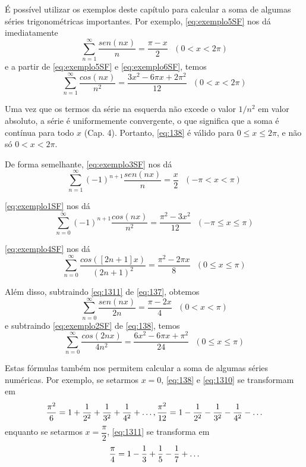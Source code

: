 É possível utilizar os exemplos deste capítulo para calcular a soma de algumas séries trigonométricas 
importantes. Por exemplo, \ref{eq:exemplo5SF} nos dá imediatamente
\begin{equation}
\label{eq:137}
    \sum\limits_{n=1}^{\infty}\dfrac{sen(nx)}{n} = \dfrac{\pi - x}{2}\text{ }(0 < x < 2\pi)
\end{equation}
e a partir de \ref{eq:exemplo5SF} e \ref{eq:exemplo6SF}, temos
\begin{equation}
\label{eq:138}
    \sum\limits_{n=1}^{\infty}\dfrac{cos(nx)}{n^2} = \dfrac{3x^2 - 6\pi x + 2\pi^2}{12}\text{ }(0 < x < 2\pi)
\end{equation}

Uma vez que os termos da série na esquerda não excede o valor $1/n^2$ em valor absoluto, a série é
uniformemente convergente, o que significa que a soma é contínua para todo $x$ (Cap. 4). Portanto,
\ref{eq:138} é válido para $0 \leq x \leq 2\pi$, e não só $0 < x < 2\pi$.

De forma semelhante, \ref{eq:exemplo3SF} nos dá
\begin{equation}
    \label{eq:139}
    \sum\limits_{n=1}^{\infty}(-1)^{n+1}\dfrac{sen(nx)}{n} = \dfrac{x}{2}\text{ }(-\pi < x < \pi)
\end{equation}

\ref{eq:exemplo1SF} nos dá
\begin{equation}
    \label{eq:1310}
    \sum\limits_{n=0}^{\infty}(-1)^{n+1}\dfrac{cos(nx)}{n^2} = \dfrac{\pi^2 - 3x^2}{12}\text{ }(-\pi \leq x \leq \pi)
\end{equation}

\ref{eq:exemplo4SF} nos dá
\begin{equation}
    \label{eq:1311}
    \sum\limits_{n=0}^{\infty}\dfrac{cos([2n+1] x)}{(2n+1)^2} = \dfrac{\pi^2 - 2\pi x}{8}\text{ }(0 \leq x \leq \pi)
\end{equation}


Além disso, subtraindo \ref{eq:1311} de \ref{eq:137}, obtemos
\begin{equation}
    \label{eq:1313}
    \sum\limits_{n=0}^{\infty}\dfrac{sen(nx)}{2n} = \dfrac{\pi - 2x}{4}\text{ }(0 < x < \pi)
\end{equation}
e subtraindo \ref{eq:exemplo2SF} de \ref{eq:138}, temos
\begin{equation}
    \label{eq:1314}
    \sum\limits_{n=0}^{\infty}\dfrac{cos(2nx)}{4n^2} = \dfrac{6x^2 - 6\pi x + \pi^2}{24}\text{ }(0 \leq x \leq \pi)
\end{equation}

Estas fórmulas também nos permitem calcular a soma de algumas séries numéricas. 
Por exemplo, se setarmos $x = 0$, \ref{eq:138} e \ref{eq:1310} se transformam 
em
\begin{equation}
\notag
    \dfrac{\pi^2}{6} = 1 + \dfrac{1}{2^2} + \dfrac{1}{3^2} + \dfrac{1}{4^2} + \ldots, \dfrac{\pi^2}{12} = 1 - \dfrac{1}{2^2} - \dfrac{1}{3^2} - \dfrac{1}{4^2} - \ldots    
\end{equation}
enquanto se setarmos $x = \dfrac{\pi}{2}$, \ref{eq:1311} se transforma em
\begin{equation}
\notag
    \dfrac{\pi}{4} = 1 - \dfrac{1}{3} + \dfrac{1}{5} - \dfrac{1}{7} + \ldots
\end{equation}